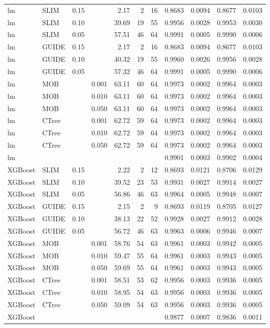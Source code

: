 \begin{table}[!htb]
\begin{tabular}[t]{l|l|r|r|r|r|r|r|r|r|r}
\hline
lm & SLIM & 0.15 & & 2.17 & 2 & 16 & 0.8683 & 0.0094 & 0.8677 & 0.0103\\
lm & SLIM & 0.10 & & 39.69 & 19 & 55 & 0.9956 & 0.0028 & 0.9953 & 0.0030\\
lm & SLIM & 0.05 & & 57.51 & 46 & 64 & 0.9991 & 0.0005 & 0.9990 & 0.0006\\
lm & GUIDE & 0.15 & & 2.17 & 2 & 16 & 0.8683 & 0.0094 & 0.8677 & 0.0103\\
lm & GUIDE & 0.10 & & 40.32 & 19 & 55 & 0.9960 & 0.0026 & 0.9956 & 0.0028\\
lm & GUIDE & 0.05 & & 57.32 & 46 & 64 & 0.9991 & 0.0005 & 0.9990 & 0.0006\\
lm & MOB & & 0.001 & 63.11 & 60 & 64 & 0.9973 & 0.0002 & 0.9964 & 0.0003\\
lm & MOB & & 0.010 & 63.11 & 60 & 64 & 0.9973 & 0.0002 & 0.9964 & 0.0003\\
lm & MOB & & 0.050 & 63.11 & 60 & 64 & 0.9973 & 0.0002 & 0.9964 & 0.0003\\
lm & CTree & & 0.001 & 62.72 & 59 & 64 & 0.9973 & 0.0002 & 0.9964 & 0.0003\\
lm & CTree & & 0.010 & 62.72 & 59 & 64 & 0.9973 & 0.0002 & 0.9964 & 0.0003\\
lm & CTree & & 0.050 & 62.72 & 59 & 64 & 0.9973 & 0.0002 & 0.9964 & 0.0003\\
\hline
lm & & & & & & & 0.9901 & 0.0003 & 0.9902 & 0.0004\\
\hline


\hline
XGBoost & SLIM & 0.15 & & 2.22 & 2 & 12 & 0.8693 & 0.0121 & 0.8706 & 0.0129\\
XGBoost & SLIM & 0.10 & & 39.52 & 23 & 53 & 0.9931 & 0.0027 & 0.9914 & 0.0027\\
XGBoost & SLIM & 0.05 & & 56.86 & 46 & 63 & 0.9964 & 0.0005 & 0.9948 & 0.0007\\
XGBoost & GUIDE & 0.15 & & 2.15 & 2 & 9 & 0.8693 & 0.0119 & 0.8705 & 0.0127\\
XGBoost & GUIDE & 0.10 & & 38.13 & 22 & 52 & 0.9928 & 0.0027 & 0.9912 & 0.0028\\
XGBoost & GUIDE & 0.05 & & 56.72 & 46 & 63 & 0.9963 & 0.0006 & 0.9946 & 0.0007\\
XGBoost & MOB & & 0.001 & 58.76 & 54 & 63 & 0.9961 & 0.0003 & 0.9942 & 0.0005\\
XGBoost & MOB & & 0.010 & 59.47 & 55 & 64 & 0.9961 & 0.0003 & 0.9943 & 0.0005\\
XGBoost & MOB & & 0.050 & 59.69 & 55 & 64 & 0.9961 & 0.0003 & 0.9943 & 0.0005\\
XGBoost & CTree & & 0.001 & 58.51 & 53 & 62 & 0.9956 & 0.0003 & 0.9936 & 0.0005\\
XGBoost & CTree & & 0.010 & 58.95 & 54 & 63 & 0.9956 & 0.0003 & 0.9936 & 0.0005\\
XGBoost & CTree & & 0.050 & 59.09 & 54 & 63 & 0.9956 & 0.0003 & 0.9936 & 0.0005\\
\hline
XGBoost & & & & & & & 0.9877 & 0.0007 & 0.9836 & 0.0011\\
\hline


\end{tabular}
\end{table}
